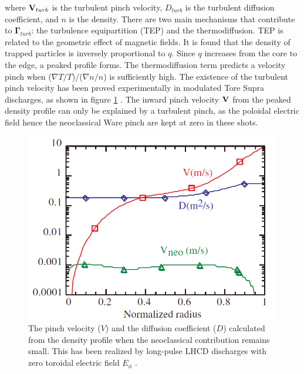 \noindent where $\boldsymbol{\mathrm{V}}_{turb}$ is the turbulent pinch velocity, $D_{turb}$ is the turbulent diffusion coefficient, and $n$ is the density. There are two main mechanisms that contribute to $\boldsymbol{\Gamma}_{turb}$: the turbulence equipartition (TEP) and the thermodiffusion. TEP is related to the geometric effect of magnetic fields. It is found that the density of trapped particles is inversely proportional to $q$. Since $q$ increases from the core to the edge, a peaked profile forms. The thermodiffusion term predicts a velocity pinch when ($\nabla T/T$)/($\nabla n/n$) is sufficiently high. The existence of the turbulent pinch velocity has been proved experimentally in modulated Tore Supra discharges, as shown in figure \ref{fig:pinch_velocity} \cite{Hoang_2003_PRL_turb_pinch}. The inward pinch velocity $\boldsymbol{\mathrm{V}}$ from the peaked density profile can only be explained by a turbulent pinch, as the poloidal electric field hence the neoclassical Ware pinch are kept at zero in these shots.

\begin{figure}[h]
\begin{centering}
\includegraphics[scale=0.5]{pinch_velocity.png}
\par\end{centering}
\caption{The pinch velocity ($V$) and the diffusion coefficient ($D$) calculated from the density profile when the neoclassical contribution remains small. This has been realized by long-pulse LHCD discharges with zero toroidal electric field $E_{\phi}$ \cite{Hoang_2003_PRL_turb_pinch}.}
\label{fig:pinch_velocity}
\end{figure}


